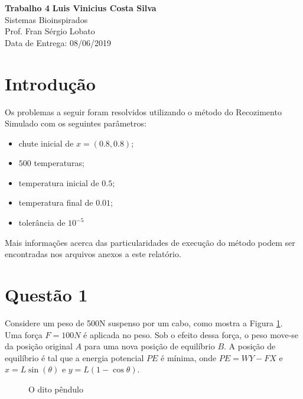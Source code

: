\documentclass[fleqn, 11pt]{article}
\begin{document}
\noindent
\large\textbf{Trabalho 4} \hfill \textbf{Luis Vinicius Costa Silva} \\
\normalsize Sistemas Bioinspirados \\
Prof. Fran Sérgio Lobato \\
\hfill Data de Entrega: 08/06/2019

\section*{Introdução}
Os problemas a seguir foram resolvidos utilizando o método do Recozimento Simulado com os seguintes parâmetros:

\begin{itemize}
\item chute inicial de $x = (0.8, 0.8)$;
\item $500$ temperaturas;
\item temperatura inicial de $0.5$;
\item temperatura final de $0.01$;
\item tolerância de $10^{-5}$
\end{itemize}

Mais informações acerca das particularidades de execução do método podem ser encontradas nos arquivos anexos a este relatório.
\section{Questão 1}
Considere um peso de 500N suspenso por um cabo, como mostra a Figura \ref{figure:fig1}. Uma força $F = 100 N$ é aplicada no peso. Sob o efeito dessa força, o peso move-se da posição original $A$ para uma nova posição de equilíbrio $B$. A posição de equilíbrio é tal que a energia potencial $PE$ é mínima, onde $PE = WY-FX$ e $x = L \sin (\theta)$ e $y = L(1 - \cos \theta)$.

\begin{figure}[!htb]
\label{figure:fig1}
   \caption{O dito pêndulo}
\end{figure}
\end{document}
